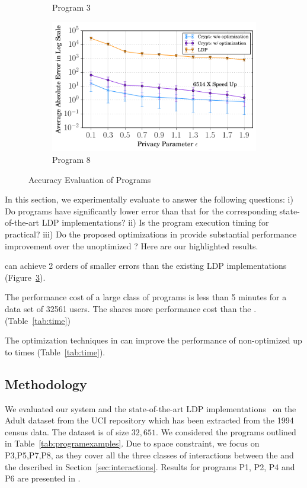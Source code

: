 \begin{figure}
\begin{subfigure}[b]{0.25\linewidth}
        \caption{Program 3}
        \label{fig:accuracy_p3}
    \end{subfigure}%
    \begin{subfigure}[b]{0.25\linewidth}
        \centering
         \includegraphics[width=1\linewidth]{t1_final.pdf}
        \caption{ Program 8 }
        \label{fig:accuracy_p8}
    \end{subfigure}%
     \caption{Accuracy Evaluation of \system Programs}\label{fig:accuracy}
\end{figure}

In this section, we experimentally evaluate \system to answer the following questions: i) Do \system programs have significantly lower error than that for the corresponding state-of-the-art LDP implementations? ii) Is the program execution timing for \system practical? iii) Do the proposed optimizations in \system provide substantial performance improvement over the unoptimized \system? Here are our highlighted results.
\squishlist
\item \system can achieve 2 orders of smaller errors than the existing LDP implementations (Figure~\ref{fig:accuracy}).
\item The performance cost of a large class of \system programs is less than 5 minutes for a data set of 32561 users. The \AS shares more performance cost than the \CPS.  (Table~\ref{tab:time})
\item The optimization techniques in \system can improve the performance of non-optimized \system up to  times (Table~\ref{tab:time}).
\squishend

\subsection{Methodology} \label{sec:methodology}
 We evaluated our system and the state-of-the-art LDP implementations~\cite{LDP1} on the Adult dataset from the UCI repository \cite{UCI}  which has been extracted from the 1994 census data. The dataset is of size $32,651$. We considered the programs outlined in Table~\ref{tab:programexamples}. Due to space constraint, we focus on P3,P5,P7,P8, as they  cover all the three classes of interactions between the \AS and the \CPS described in Section~\ref{sec:interactions}.  Results for programs P1, P2, P4 and P6 are presented in .

